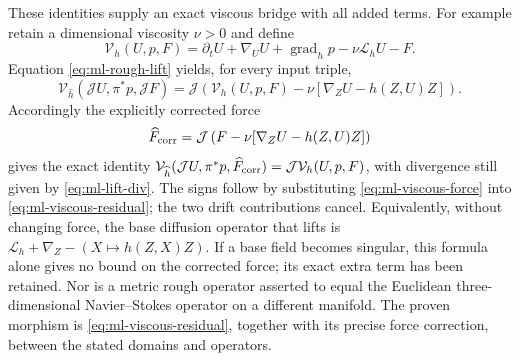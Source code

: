 These identities supply an exact viscous bridge with all added terms.
For example retain a dimensional viscosity $\nu>0$ and define
\[
 \mathcal V_h(U,p,F)
 =\partial_tU+\nabla_UU+\operatorname{grad}_hp
                           -\nu\mathscr L_hU-F.
\]
Equation \eqref{eq:ml-rough-lift} yields, for every input triple,
\begin{equation}\label{eq:ml-viscous-residual}
 \mathcal V_{\widehat h}(\mathcal JU,\pi^*p,\mathcal JF)
 =\mathcal J\left(\mathcal V_h(U,p,F)
              -\nu[\nabla_ZU-h(Z,U)Z]\right).
\end{equation}
Accordingly the explicitly corrected force
\begin{equation}\label{eq:ml-viscous-force}
 \widehat F_{\rm corr}
 =\mathcal J\left(F-\nu[\nabla_ZU-h(Z,U)Z]\right)
\end{equation}
gives the exact identity
$\mathcal V_{\widehat h}(\mathcal JU,\pi^*p,\widehat F_{\rm corr})
=\mathcal J\mathcal V_h(U,p,F)$, with divergence still given by
\eqref{eq:ml-lift-div}. The signs follow by substituting
\eqref{eq:ml-viscous-force} into \eqref{eq:ml-viscous-residual}; the two
drift contributions cancel. Equivalently, without changing force, the
base diffusion operator that lifts is
$\mathscr L_h+\nabla_Z-(X\mapsto h(Z,X)Z)$.
If a base field becomes singular, this formula alone gives no bound on
the corrected force; its exact extra term has been retained. Nor is a
metric rough operator asserted to equal the Euclidean three-dimensional
Navier--Stokes operator on a different manifold. The proven morphism is
\eqref{eq:ml-viscous-residual}, together with its precise force correction,
between the stated domains and operators.
